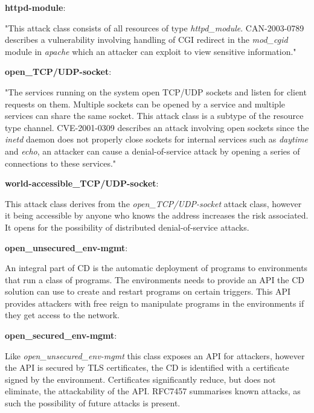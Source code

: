 
\textbf{httpd-module}: \begin{displayquote}
"This attack class consists of all resources of type \textit{httpd\_module}. CAN-2003-0789 describes a vulnerability  involving  handling  of  CGI  redirect  in  the \textit{mod\_cgid} module in \textit{apache} which an attacker can exploit to view sensitive information."\footnotemark[2]
\end{displayquote}

\textbf{open\_TCP/UDP-socket}: \begin{displayquote}
"The services  running  on  the system open TCP/UDP sockets and listen for client requests on them. Multiple sockets can be opened by a service and multiple services can share the same socket. This attack class is a subtype of the resource type channel. CVE-2001-0309 describes an attack involving open sockets since the \textit{inetd} daemon does not properly close sockets for internal services such as \textit{daytime} and \textit{echo}, an attacker can cause a denial-of-service attack by opening a series of connections to these services."\footnotemark[2]
\end{displayquote}


\textbf{world-accessible\_TCP/UDP-socket}: \begin{displayquote}
This attack class derives from the \textit{open\_TCP/UDP-socket} attack class, however it being accessible by anyone who knows the address increases the risk associated. It opens for the possibility of distributed denial-of-service attacks\cite{ddos}.
\end{displayquote}

\textbf{open\_unsecured\_env-mgmt}: \begin{displayquote}
An integral part of CD is the automatic deployment of programs to environments that run a class of programs. The environments needs to provide an API the CD solution can use to create and restart programs on certain triggers. This API provides attackers with free reign to manipulate programs in the environments if they get access to the network. 
\end{displayquote}

\textbf{open\_secured\_env-mgmt}: \begin{displayquote}
Like \textit{open\_unsecured\_env-mgmt} this class exposes an API for attackers, however the API is secured by TLS certificates, the CD is identified with a certificate signed by the environment. Certificates significantly reduce, but does not eliminate, the attackability of the API. RFC7457\cite{rfc7457} summarises known attacks, as such the possibility of future attacks is present.
\end{displayquote}

